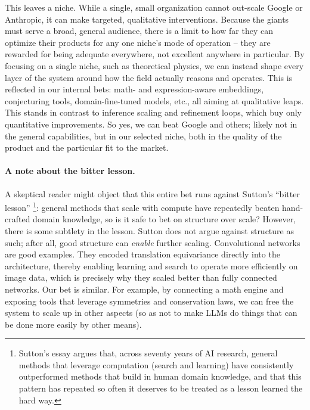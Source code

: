 This leaves a niche. While a single, small organization cannot out-scale Google or Anthropic, it can make targeted, qualitative interventions. Because the giants must serve a broad, general audience, there is a limit to how far they can optimize their products for any one niche's mode of operation -- they are rewarded for being adequate everywhere, not excellent anywhere in particular. By focusing on a single niche, such as theoretical physics, we can instead shape every layer of the system around how the field actually reasons and operates.
This is reflected in our internal bets: math- and expression-aware embeddings, conjecturing tools, domain-fine-tuned models, etc., all aiming at qualitative leaps. This stands in contrast to inference scaling and refinement loops, which buy only quantitative improvements. So yes, we can beat Google and others; likely not in the general capabilities, but in our selected niche, both in the quality of the product and the particular fit to the market.

\paragraph{A note about the bitter lesson.}
A skeptical reader might object that this entire bet runs against Sutton's ``bitter lesson'' \cite{Sutton2019}\footnote{%
    Sutton's essay argues that, across seventy years of AI research, general methods that leverage computation (search and learning) have consistently outperformed methods that build in human domain knowledge, and that this pattern has repeated so often it deserves to be treated as a lesson learned the hard way.
}: general methods that scale with compute have repeatedly beaten hand-crafted domain knowledge, so is it safe to bet on structure over scale? However, there is some subtlety in the lesson. Sutton does not argue against structure as such; after all, good structure can \emph{enable} further scaling. Convolutional networks are good examples. They encoded translation equivariance directly into the architecture, thereby enabling learning and search to operate more efficiently on image data, which is precisely why they scaled better than fully connected networks. Our bet is similar. For example, by connecting a math engine and exposing tools that leverage symmetries and conservation laws, we can free the system to scale up in other aspects (so as not to make LLMs do things that can be done more easily by other means).

